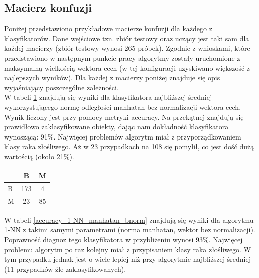 \documentclass[12pt]{article}
\begin{document}
\subsection{Macierz konfuzji}
\indent Poniżej przedstawiono przykładowe macierze konfuzji dla każdego z klasyfikatorów. Dane wejściowe tzn. zbiór testowy oraz uczący jest taki sam dla każdej macierzy (zbiór testowy wynosi 265 próbek). Zgodnie z wnioskami, które przedstawiono w następnym punkcie pracy algorytmy zostały uruchomione z maksymalną wielkością wektora cech (w tej konfiguracji uzyskiwano większość z najlepszych wyników). Dla każdej z macierzy poniżej znajduje się opis wyjaśniający poszczególne zależności.\\
\indent W tabeli \ref{accuracy_nm_manhatan_bnorm} znajdują się wyniki dla klasyfikatora najbliższej średniej wykorzystującego normę odległości manhatan bez normalizacji wektora cech. Wynik liczony jest przy pomocy metryki accuracy. Na przekątnej znajdują się prawidłowo zaklasyfikowane obiekty, dając nam dokładność klasyfikatora wynoszącą: 91\%. Najwięcej problemów algorytm miał z przyporządkowaniem klasy raka złośliwego. Aż w 23 przypadkach na 108 się pomylił, co jest dość dużą wartością (około 21\%). 
\begin{table}[H]
\begin{center}
\label{accuracy_nm_manhatan_bnorm} 
\begin{LARGE}
\begin{tabular}{l|c|c|}
\cline{2-3}
                        & B & M \\ \hline
\multicolumn{1}{|l|}{B} & 173 & 4 \\ \hline
\multicolumn{1}{|l|}{M} & 23 & 85 \\ \hline
\end{tabular}
\end{LARGE}
\end{center}
\end{table}

\indent W tabeli \ref{accuracy_1-NN_manhatan_bnorm} znajdują się wyniki dla algorytmu 1-NN z takimi samymi parametrami (norma manhatan, wektor bez normalizacji). Poprawność diagnoz tego klasyfikatora w przybliżeniu wynosi 93\%. Najwięcej problemu algorytm po raz kolejny miał z przypisaniem klasy raka złośliwego. W tym przypadku jednak jest o wiele lepiej niż przy algorytmie najbliższej średniej (11 przypadków źle zaklasyfikowanych).
\end{document}
